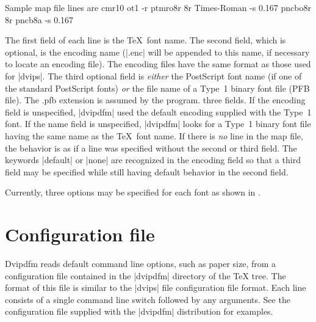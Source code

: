 {Sample map file lines are\nobreak
\begintt
cmr10 ot1 -r
ptmro8r 8r Times-Roman -s 0.167
pncbo8r 8r pncb8a -s 0.167
\endtt

The first field of each line
is the \TeX\ font name.  The second
field, which is optional, is the encoding name (|.enc| will
be appended to this name, if necessary
to locate an encoding file).  The
encoding files have the same format
as those used for |dvips|.
The third optional field is {\it either} the PostScript font
name (if one of the standard PostScript fonts) {\it or}
the file name of a Type~1 binary font file (PFB file).
The {}.pfb extension is assumed by the program.
three fields. If the encoding field is unspecified,
|dvipdfm| used the default encoding supplied with
the Type~1 font.  If the name field is unspecified,
|dvipdfm| looks for a Type~1 binary font file
having the same name as the \TeX\ font name.
If there is {\it no} line in the map file,
the behavior is as if a line was specified
without the second or third field.
The keywords |default| or |none| are
recognized in the encoding field so that
a third field may be specified while still
having default behavior in the second field.

Currently, three options may be specified for each font
as shown in .
\topinsert
{}
\centerline{}
\bigskip\nobreak
\centerline{\vbox{}}
\endinsert

\section{Configuration file}
{}Dvipdfm reads default command line options, such
as paper size, from a configuration
file contained in the |dvipdfm| directory of the TeX tree.
The format of this file is similar to the |dvips| file configuration
file format.  Each line consists of a single command line switch
followed by any arguments.  See the configuration file supplied
with the |dvipdfm| distribution for examples.

}
